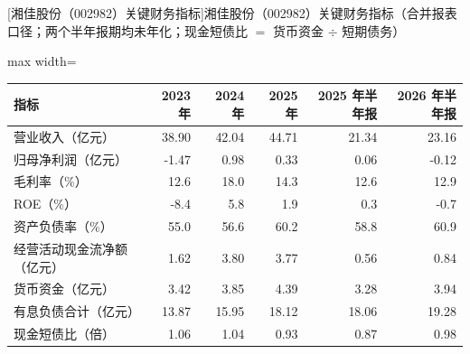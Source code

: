 \begin{center}\small\setlength{\tabcolsep}{3.4pt}
[湘佳股份（002982）关键财务指标]{湘佳股份（002982）关键财务指标（合并报表口径；两个半年报期均未年化；现金短债比 $=$ 货币资金 $\div$ 短期债务）}
\begin{adjustbox}{max width=\textwidth}
\begin{tabular}{@{}lrrrrr@{}}
\toprule
指标 & 2023 年 & 2024 年 & 2025 年 & 2025 年半年报 & 2026 年半年报 \\
\midrule
营业收入（亿元） & 38.90 & 42.04 & 44.71 & 21.34 & 23.16 \\
归母净利润（亿元） & -1.47 & 0.98 & 0.33 & 0.06 & -0.12 \\
毛利率（\%） & 12.6 & 18.0 & 14.3 & 12.6 & 12.9 \\
ROE（\%） & -8.4 & 5.8 & 1.9 & 0.3 & -0.7 \\
资产负债率（\%） & 55.0 & 56.6 & 60.2 & 58.8 & 60.9 \\
经营活动现金流净额（亿元） & 1.62 & 3.80 & 3.77 & 0.56 & 0.84 \\
货币资金（亿元） & 3.42 & 3.85 & 4.39 & 3.28 & 3.94 \\
有息负债合计（亿元） & 13.87 & 15.95 & 18.12 & 18.06 & 19.28 \\
现金短债比（倍） & 1.06 & 1.04 & 0.93 & 0.87 & 0.98 \\
\bottomrule
\end{tabular}
\end{adjustbox}
\end{center}

